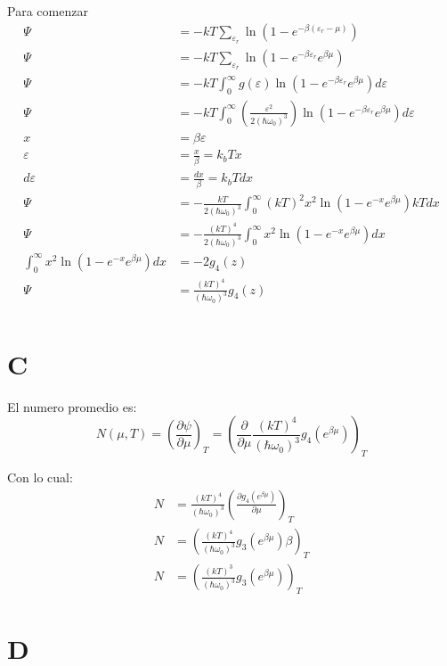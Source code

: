 \documentclass{report}
\begin{document}
Para comenzar
\begin{align*}
  \Psi &= -kT \sum_{\varepsilon_r} \ln (1 - e^{-\beta (\varepsilon_r - \mu)})\\
  \Psi &= -kT \sum_{\varepsilon_r} \ln (1 - e^{-\beta\varepsilon_r} e^{\beta\mu})\\
  \Psi &= -kT \int_0^\infty g(\varepsilon) \ln (1 - e^{-\beta\varepsilon_r} e^{\beta\mu}) d\varepsilon\\
  \Psi &= -kT \int_0^\infty \left(\frac{\varepsilon^2}{2(\hbar \omega_0)^3}\right) \ln (1 - e^{-\beta\varepsilon_r} e^{\beta\mu}) d\varepsilon\\
  x &= \beta \varepsilon\\
  \varepsilon &= \frac{x}{\beta} = k_b T x\\
  d\varepsilon &= \frac{dx}{\beta} = k_b T dx\\
  \Psi &= -\frac{kT}{2(\hbar \omega_0)^3} \int_0^\infty (kT)^2 x^2 \ln (1 - e^{-x} e^{\beta\mu}) kTdx\\
  \Psi &= -\frac{(kT)^4}{2(\hbar \omega_0)^3} \int_0^\infty x^2 \ln (1 - e^{-x} e^{\beta\mu}) dx\\
  \int_0^\infty x^2 \ln (1 - e^{-x} e^{\beta\mu}) dx &= -2 g_4(z)\\
  \Psi &= \frac{(kT)^4}{(\hbar \omega_0)^3} g_4(z)\\
\end{align*}

\section{C}

El numero promedio es:
\[
  N(\mu, T) = \left( \frac{\partial \psi}{\partial \mu} \right)_T = \left( \frac{\partial}{\partial \mu} \frac{(kT)^4}{(\hbar\omega_0)^3} g_4(e^{\beta\mu}) \right)_T
\]

Con lo cual:
\begin{align*}
  N &= \frac{(kT)^4}{(\hbar \omega_0)^3} \left( \frac{\partial g_4(e^{\beta\mu})}{\partial \mu}\right)_T\\
  N &= \left(\frac{(kT)^4}{(\hbar \omega_0)^3} g_3(e^{\beta \mu})\beta\right)_T\\
  N &= \left(\frac{(kT)^3}{(\hbar \omega_0)^3} g_3(e^{\beta \mu})\right)_T
\end{align*}

\section{D}
\end{document}

